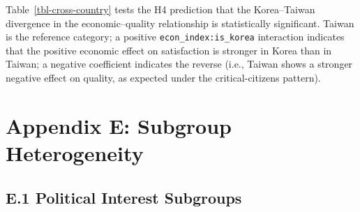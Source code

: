 \documentclass[
  12pt,
  letterpaper]{article}
\begin{document}
Table~\ref{tbl-cross-country} tests the H4 prediction that the
Korea--Taiwan divergence in the economic--quality relationship is
statistically significant. Taiwan is the reference category; a positive
\texttt{econ\_index:is\_korea} interaction indicates that the positive
economic effect on satisfaction is stronger in Korea than in Taiwan; a
negative coefficient indicates the reverse (i.e., Taiwan shows a
stronger negative effect on quality, as expected under the
critical-citizens pattern).

\begin{table}

\caption{\label{tbl-cross-country}Cross-country interaction: econ x
Korea, all five outcomes}


\end{table}%

\section{Appendix E: Subgroup
Heterogeneity}\label{appendix-e-subgroup-heterogeneity}

\subsection{E.1 Political Interest
Subgroups}\label{e.1-political-interest-subgroups}
\end{document}
